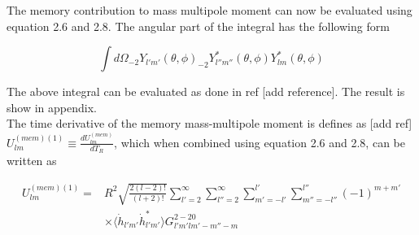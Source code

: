 \documentclass[prd,preprintnumbers,twocolumn,eqsecnum,floatfix,letter]{revtex4}
\begin{document}
The memory contribution to mass multipole moment can now be evaluated using equation 2.6 and 2.8. The angular part of the integral has the following form

\begin{equation}
	\int d\Omega _{-2}Y_{l'm'}(\theta,\phi)_{-2}Y_{l''m''}^{*}(\theta, \phi)Y_{lm}^{*}(\theta, \phi)
\end{equation}

The above integral can be evaluated as done in ref [add reference]. The result is show in appendix. \\
The time derivative of the memory mass-multipole moment is defines as [add ref] 
 $U^{(mem)(1)}_{lm}\equiv\frac{dU^{(mem)}_{lm}}{dT_R}$, which when combined using equation 2.6 and 2.8, can be written as

\begin{align}
	U_{lm}^{(mem)(1)}=&R^{2}\sqrt{\frac{2(l-2)!}{(l+2)!}}\sum_{l'=2}^{\infty}\sum_{l''=2}^{\infty}\sum_{m'=-l'}^{l'}\sum_{m''=-l''}^{l''}(-1)^{m+m'}\\
	&\times\Bigg\langle \dot{h}_{l'm'}\dot{h}_{l'm'}^{*}\Bigg\rangle G^{2-20}_{l'm'lm'-m''-m}
\end{align}
 
\end{document}
